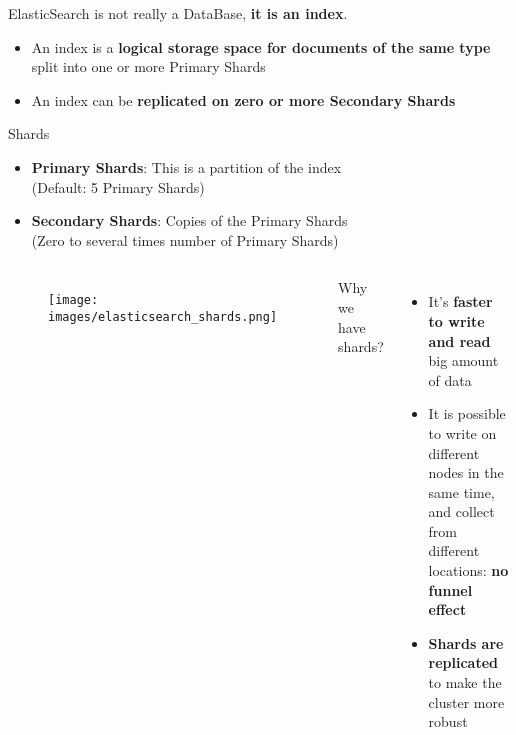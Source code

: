 \documentclass{beamer}[10pt, usepdftitle=false handout]
\begin{document}
\begin{frame}
ElasticSearch is not really a DataBase, \textbf{it is an index}.
\vspace*{0.6em}

\begin{itemize}
\item{An index is a \textbf{logical storage space for documents of the same type} split into one or more Primary Shards}
\item{An index can be \textbf{replicated on zero or more Secondary Shards}}
\end{itemize}

\begin{block}{Shards}
\begin{itemize}
\item{\textbf{Primary Shards}: This is a partition of the index \\ (Default: 5 Primary Shards)}
\item{\textbf{Secondary Shards}: Copies of the Primary Shards \\ (Zero to several times number of Primary Shards)}
\end{itemize}
\end{block}


\end{frame}
\begin{frame}

\begin{columns}[c]

\begin{figure}
	\texttt{[image: images/elasticsearch\_shards.png]} 
\end{figure}	

Why we have shards?
\vspace*{0.6em}

\begin{itemize}
\item{It's \textbf{faster to write and read} big amount of data}
\item{It is possible to write on different nodes in the same time, and collect from different locations: \textbf{no funnel effect}}
\item{\textbf{Shards are replicated} to make the cluster more robust}
\end{itemize}
\end{columns}

\end{frame}
\end{document}
